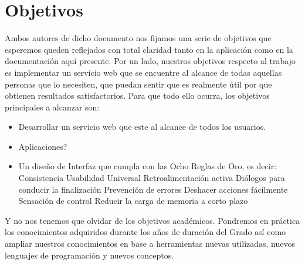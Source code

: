 \section{Objetivos}
Ambos autores de dicho documento nos fijamos una serie de objetivos que esperemos queden reflejados con total claridad tanto en la aplicación como en la documentación aquí presente. Por un lado, nuestros objetivos respecto al trabajo es implementar un servicio web  que se encuentre al alcance de todas aquellas personas que lo necesiten, que puedan sentir que es realmente útil por que obtienen resultados satisfactorios. Para que todo ello ocurra, los objetivos principales a alcanzar son:
\begin{itemize}
	\item Desarrollar un servicio web que este al alcance de todos los usuarios.	
	\item Aplicaciones?
	\item Un diseño de Interfaz que cumpla con las Ocho Reglas de Oro, es decir: 
	\subitem Consistencia
	\subitem Usabilidad Universal
	\subitem Retroalimentación activa
	\subitem Diálogos para conducir la finalización
	\subitem Prevención de errores
	\subitem Deshacer acciones fácilmente
	\subitem Sensación de control
	\subitem Reducir la carga de memoria a corto plazo
\end{itemize}
Y no nos tenemos que olvidar de los objetivos académicos. Pondremos en práctica los conocimientos adquiridos durante los años de duración del Grado así como ampliar nuestros conocimientos en base a herramientas nuevas utilizadas, nuevos lenguajes de programación y nuevos conceptos.